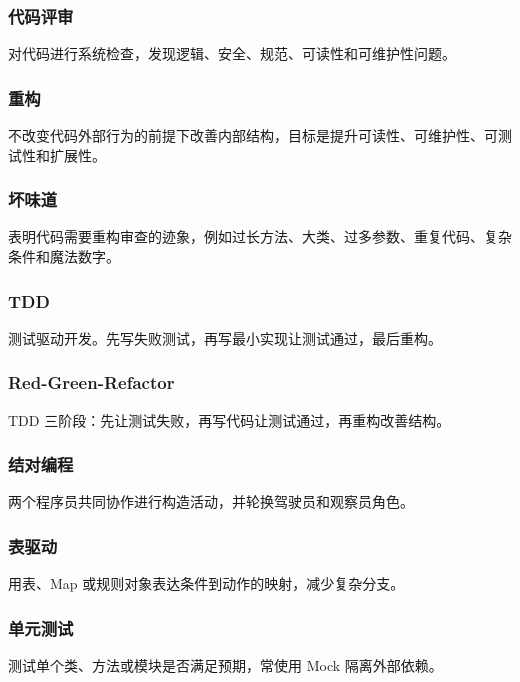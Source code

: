 \documentclass[UTF8,zihao=-4]{ctexart}
\begin{document}
\subsubsection*{代码评审}


对代码进行系统检查，发现逻辑、安全、规范、可读性和可维护性问题。


\subsubsection*{重构}


不改变代码外部行为的前提下改善内部结构，目标是提升可读性、可维护性、可测试性和扩展性。


\subsubsection*{坏味道}


表明代码需要重构审查的迹象，例如过长方法、大类、过多参数、重复代码、复杂条件和魔法数字。


\subsubsection*{TDD}


测试驱动开发。先写失败测试，再写最小实现让测试通过，最后重构。


\subsubsection*{Red-Green-Refactor}


TDD 三阶段：先让测试失败，再写代码让测试通过，再重构改善结构。


\subsubsection*{结对编程}


两个程序员共同协作进行构造活动，并轮换驾驶员和观察员角色。


\subsubsection*{表驱动}


用表、Map 或规则对象表达条件到动作的映射，减少复杂分支。


\subsubsection*{单元测试}


测试单个类、方法或模块是否满足预期，常使用 Mock 隔离外部依赖。
\end{document}
